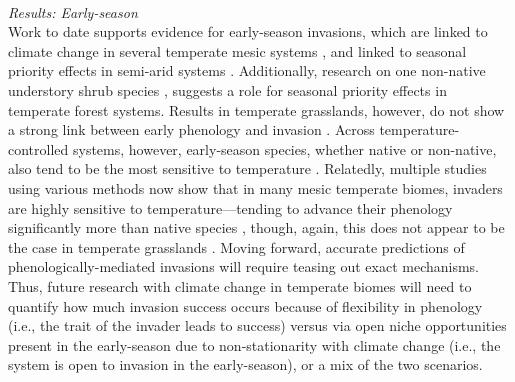 \documentclass[11pt,a4paper,oneside]{article}
\begin{document}
\\

\noindent \emph{Results: Early-season}\\
\noindent  Work to date supports evidence for early-season invasions, which are linked to climate change in several temperate mesic systems \citep{wolkovichAmBot2013}, and linked to seasonal priority effects in semi-arid systems \citep{dickson2012,Wainwright:2012tw}. Additionally, research on one non-native understory shrub species \citep{Xu:2007he}, suggests a role for seasonal priority effects in temperate forest systems. Results in temperate grasslands, however, do not show a strong link between early phenology and invasion \citep{wolkovichAmBot2013}. Across temperature-controlled systems, however, early-season species, whether native or non-native, also tend to be the most sensitive to temperature \citep{Cook:2012,Wolkovich:2012n}. Relatedly, multiple studies using various methods now show that in many mesic temperate biomes, invaders are highly sensitive to temperature---tending to advance their phenology significantly more than native species \citep{Willis:2010al,wolkovichAmBot2013}, though, again, this does not appear to be the case in temperate grasslands \citep{wolkovichAmBot2013}. Moving forward, accurate predictions of phenologically-mediated invasions will require teasing out exact mechanisms. Thus, future research with climate change in temperate biomes will need to quantify how much invasion success occurs because of flexibility in phenology (i.e., the trait of the invader leads to success) versus via open niche opportunities present in the early-season due to non-stationarity with climate change (i.e., the system is open to invasion in the early-season), or a mix of the two scenarios. \\
\end{document}
